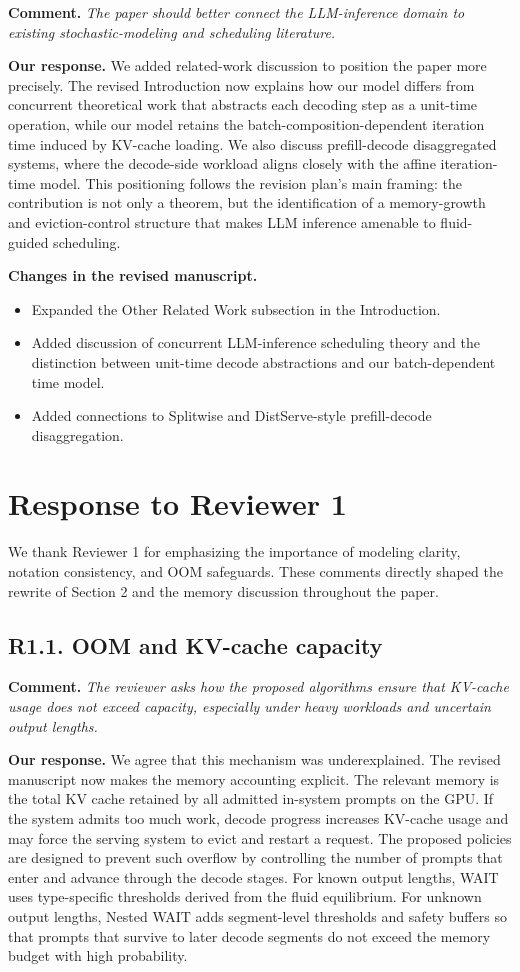 \documentclass[11pt]{article}
\newcommand{\comment}[1]{%
  \vspace{0.25em}
  \noindent\textbf{Comment.} \emph{#1}
}
\newcommand{\response}{\vspace{0.25em}\noindent\textbf{Our response.} }
\newcommand{\changes}{\vspace{0.25em}\noindent\textbf{Changes in the revised manuscript.} }
\begin{document}
\comment{The paper should better connect the LLM-inference domain to existing stochastic-modeling and scheduling literature.}

\response We added related-work discussion to position the paper more precisely. The revised Introduction now explains how our model differs from concurrent theoretical work that abstracts each decoding step as a unit-time operation, while our model retains the batch-composition-dependent iteration time induced by KV-cache loading. We also discuss prefill-decode disaggregated systems, where the decode-side workload aligns closely with the affine iteration-time model. This positioning follows the revision plan's main framing: the contribution is not only a theorem, but the identification of a memory-growth and eviction-control structure that makes LLM inference amenable to fluid-guided scheduling.

\changes
\begin{itemize}
    \item Expanded the Other Related Work subsection in the Introduction.
    \item Added discussion of concurrent LLM-inference scheduling theory and the distinction between unit-time decode abstractions and our batch-dependent time model.
    \item Added connections to Splitwise and DistServe-style prefill-decode disaggregation.
\end{itemize}

\section*{Response to Reviewer 1}

We thank Reviewer 1 for emphasizing the importance of modeling clarity, notation consistency, and OOM safeguards. These comments directly shaped the rewrite of Section 2 and the memory discussion throughout the paper.

\subsection*{R1.1. OOM and KV-cache capacity}

\comment{The reviewer asks how the proposed algorithms ensure that KV-cache usage does not exceed capacity, especially under heavy workloads and uncertain output lengths.}

\response We agree that this mechanism was underexplained. The revised manuscript now makes the memory accounting explicit. The relevant memory is the total KV cache retained by all admitted in-system prompts on the GPU. If the system admits too much work, decode progress increases KV-cache usage and may force the serving system to evict and restart a request. The proposed policies are designed to prevent such overflow by controlling the number of prompts that enter and advance through the decode stages. For known output lengths, WAIT uses type-specific thresholds derived from the fluid equilibrium. For unknown output lengths, Nested WAIT adds segment-level thresholds and safety buffers so that prompts that survive to later decode segments do not exceed the memory budget with high probability.
\end{document}
